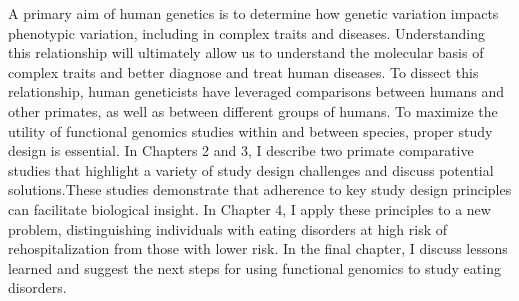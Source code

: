 \abstract
A primary aim of human genetics is to determine how genetic variation impacts phenotypic variation, including in complex traits and diseases. Understanding this relationship will ultimately allow us to understand the molecular basis of complex traits and better diagnose and treat human diseases. To dissect this relationship, human geneticists have leveraged comparisons between humans and other primates, as well as between different groups of humans. To maximize the utility of functional genomics studies within and between species, proper study design is essential. In Chapters 2 and 3, I describe two primate comparative studies that highlight a variety of study design challenges and discuss potential solutions.These studies demonstrate that adherence to key study design principles can facilitate biological insight. In Chapter 4, I apply these principles to a new problem, distinguishing individuals with eating disorders at high risk of rehospitalization from those with lower risk. In the final chapter, I discuss lessons learned and suggest the next steps for using functional genomics to study eating disorders.
